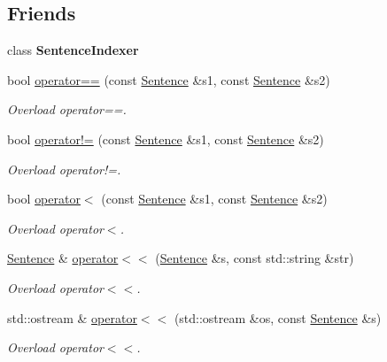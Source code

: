 \subsection*{Friends}
\begin{DoxyCompactItemize}
\item 
\mbox{\label{class_sentence_abf4e586c2270fcc2c7ef8253a33d6a8f}} 
class {\bfseries Sentence\+Indexer}
\item 
bool \hyperlink{class_sentence_afde1485f4949e9edb093c86d2ab27a2d}{operator==} (const \hyperlink{class_sentence}{Sentence} \&s1, const \hyperlink{class_sentence}{Sentence} \&s2)
\begin{DoxyCompactList}\small\item\em Overload operator==. \end{DoxyCompactList}\item 
bool \hyperlink{class_sentence_a84044f682118271ebe2616b422351d9a}{operator!=} (const \hyperlink{class_sentence}{Sentence} \&s1, const \hyperlink{class_sentence}{Sentence} \&s2)
\begin{DoxyCompactList}\small\item\em Overload operator!=. \end{DoxyCompactList}\item 
bool \hyperlink{class_sentence_ad954a285e5a614d6c239835d0b18aabf}{operator$<$} (const \hyperlink{class_sentence}{Sentence} \&s1, const \hyperlink{class_sentence}{Sentence} \&s2)
\begin{DoxyCompactList}\small\item\em Overload operator$<$. \end{DoxyCompactList}\item 
\hyperlink{class_sentence}{Sentence} \& \hyperlink{class_sentence_a6ef9e41c0c425b100ed7a95f482d2099}{operator$<$$<$} (\hyperlink{class_sentence}{Sentence} \&s, const std\+::string \&str)
\begin{DoxyCompactList}\small\item\em Overload operator$<$$<$. \end{DoxyCompactList}\item 
std\+::ostream \& \hyperlink{class_sentence_a0dd25702b7879e72e37114a601824505}{operator$<$$<$} (std\+::ostream \&os, const \hyperlink{class_sentence}{Sentence} \&s)
\begin{DoxyCompactList}\small\item\em Overload operator$<$$<$. \end{DoxyCompactList}\end{DoxyCompactItemize}
